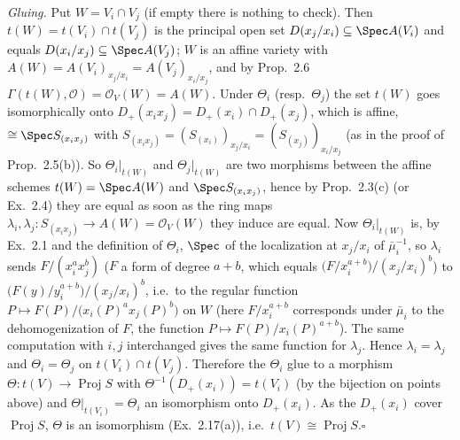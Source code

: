 \documentclass[11pt]{article}
\begin{document}
\emph{Gluing.} Put $W=V_i\cap V_j$ (if empty there is nothing to check). Then $t(W)=t(V_i)\cap t(V_j)$ is the principal open set $D(x_j/x_i)\subseteq\Spec A(V_i)$ and equals $D(x_i/x_j)\subseteq\Spec A(V_j)$; $W$ is an affine variety with $A(W)=A(V_i)_{x_j/x_i}=A(V_j)_{x_i/x_j}$, and by Prop.~2.6 $\Gamma(t(W),\mathcal O)=\mathcal O_V(W)=A(W)$. Under $\Theta_i$ (resp.\ $\Theta_j$) the set $t(W)$ goes isomorphically onto $D_+(x_ix_j)=D_+(x_i)\cap D_+(x_j)$, which is affine, $\cong\Spec S_{(x_ix_j)}$ with $S_{(x_ix_j)}=(S_{(x_i)})_{x_j/x_i}=(S_{(x_j)})_{x_i/x_j}$ (as in the proof of Prop.~2.5(b)). So $\Theta_i|_{t(W)}$ and $\Theta_j|_{t(W)}$ are two morphisms between the affine schemes $t(W)=\Spec A(W)$ and $\Spec S_{(x_ix_j)}$, hence by Prop.~2.3(c) (or Ex.~2.4) they are equal as soon as the ring maps $\lambda_i,\lambda_j:S_{(x_ix_j)}\to A(W)=\mathcal O_V(W)$ they induce are equal. Now $\Theta_i|_{t(W)}$ is, by Ex.~2.1 and the definition of $\Theta_i$, $\Spec$ of the localization at $x_j/x_i$ of $\bar\mu_i^{-1}$, so $\lambda_i$ sends $F/(x_i^ax_j^b)$ ($F$ a form of degree $a+b$, which equals $\bigl(F/x_i^{a+b}\bigr)/(x_j/x_i)^b$) to $\bigl(F(y)/y_i^{a+b}\bigr)\big/(x_j/x_i)^b$, i.e.\ to the regular function $P\mapsto F(P)/\bigl(x_i(P)^ax_j(P)^b\bigr)$ on $W$ (here $F/x_i^{a+b}$ corresponds under $\bar\mu_i$ to the dehomogenization of $F$, the function $P\mapsto F(P)/x_i(P)^{a+b}$). The same computation with $i,j$ interchanged gives the same function for $\lambda_j$. Hence $\lambda_i=\lambda_j$ and $\Theta_i=\Theta_j$ on $t(V_i)\cap t(V_j)$. Therefore the $\Theta_i$ glue to a morphism $\Theta:t(V)\to\operatorname{Proj}S$ with $\Theta^{-1}(D_+(x_i))=t(V_i)$ (by the bijection on points above) and $\Theta|_{t(V_i)}=\Theta_i$ an isomorphism onto $D_+(x_i)$. As the $D_+(x_i)$ cover $\operatorname{Proj}S$, $\Theta$ is an isomorphism (Ex.~2.17(a)), i.e.\ $t(V)\cong\operatorname{Proj}S$.\hfill$\square$
\end{document}
